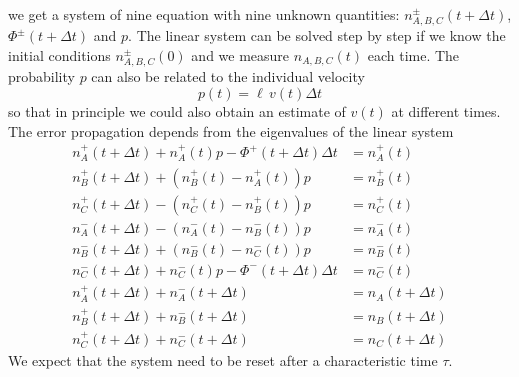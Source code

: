 \documentclass{article}
\begin{document}
we get a system of nine equation with nine unknown quantities: \(n^{\pm}_{A,B,C}(t + \Delta t)\), \(\Phi^{\pm}(t + \Delta t)\) and \(p\).
The linear system can be solved step by step if we know the initial conditions \(n^{\pm}_{A,B,C}(0)\) and we measure \(n_{A,B,C}(t)\) each time. The probability \(p\) can also be related to the individual velocity
\[
p(t) = \ell \, v(t) \Delta t 
\]
so that in principle we could also obtain an estimate of \(v(t)\) at different times. The error propagation depends from the eigenvalues of the linear system
\begin{align*}
n^+_A(t + \Delta t) +  n^+_A(t)p   - \Phi^+(t + \Delta t)\Delta t &= n^+_A(t)        \\
n^+_B(t + \Delta t) + (n^+_B(t)    - n^+_A(t))p                   &= n^+_B(t)        \\
n^+_C(t + \Delta t) - (n^+_C(t)    - n^+_B(t))p                   &= n^+_C(t)        \\
n^-_A(t + \Delta t) - (n^-_A(t)    - n^-_B(t))p                   &= n^-_A(t)        \\
n^-_B(t + \Delta t) + (n^-_B(t)    - n^-_C(t))p                   &= n^-_B(t)        \\
n^-_C(t + \Delta t) +  n^-_C(t)p   - \Phi^-(t + \Delta t)\Delta t &= n^-_C(t)        \\
n^+_A(t + \Delta t) +  n^-_A(t+\Delta t)                          &= n_A(t+\Delta t) \\
n^+_B(t + \Delta t) +  n^-_B(t+\Delta t)                          &= n_B(t+\Delta t) \\
n^+_C(t + \Delta t) +  n^-_C(t+\Delta t)                          &= n_C(t+\Delta t)
\end{align*}
We expect that the system need to be reset after a characteristic time \(\tau\).
 
\end{document}
